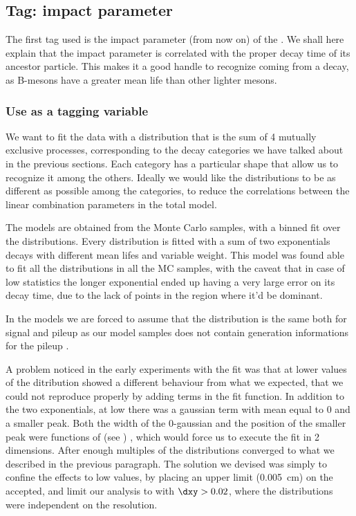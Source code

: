 \subsection{Tag: impact parameter}
\label{subsec:tag_impact_par}

The first tag used is the impact parameter (\dxy from now on) of the \Pgm.
We shall here explain that the \Pgm impact parameter is correlated with the proper decay time of its ancestor particle.
This makes it a good handle to recognize \Pgm coming from a \Pqb decay, as B-mesons have a greater mean life than other lighter mesons.



\subsubsection{Use as a tagging variable}
\label{subsubsec:imppar_use}

We want to fit the data with a distribution that is the sum of 4 mutually exclusive processes, corresponding to the decay categories we have talked about in the previous sections.
Each category  has a particular shape that allow us to recognize it among the others.
Ideally we would like the \dxy distributions to be as different as possible among the categories, to reduce the correlations between the linear combination parameters in the total model.

The models are obtained from the Monte Carlo samples, with a binned fit over the \dxy distributions.
Every distribution is fitted with a sum of two exponentials decays with different mean lifes and variable weight.
This model was found able to fit all the distributions in all the MC samples, with the caveat that in case of low statistics the longer exponential ended up having a very large error on its decay time, due to the lack of points in the region where it'd be dominant.

In the models we are forced to assume that the distribution is the same both for signal and pileup \Pgm as our model samples does not contain generation informations for the pileup \Pgm. 

A problem noticed in the early experiments with the fit was that at lower values of \dxy the ditribution showed a different behaviour from what we expected, that we could not reproduce properly by adding terms in the fit function.
In addition to the two exponentials, at low \dxy there was a gaussian term with mean equal to 0 and a smaller peak. 
Both the width of the 0-gaussian and the position of the smaller peak were functions of \exy (see ) , which would force us to execute the fit in 2 dimensions.
After enough multiples of \exy the distributions converged to what we described in the previous paragraph.
The solution we devised was simply to confine the \exy effects to low \dxy values, by placing an upper limit (\SI{0.005}{\cm}) on the \exy accepted, and limit our analysis to \Pgm with $\dxy > 0.02$, where the distributions were independent on the resolution.

